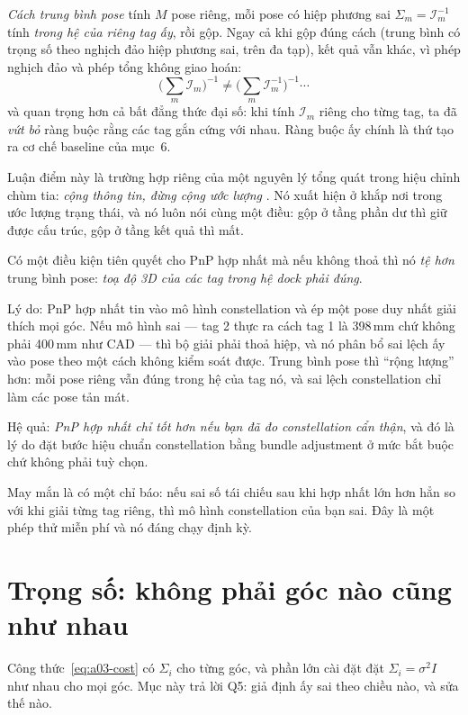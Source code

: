 \documentclass[../../marker.tex]{subfiles}
\begin{document}
\emph{Cách trung bình pose} tính \(M\) pose riêng, mỗi pose có hiệp phương sai \(\Sigma_m = \mathcal{I}_m^{-1}\) tính \emph{trong hệ của riêng tag ấy}, rồi gộp. Ngay cả khi gộp đúng cách (trung bình có trọng số theo nghịch đảo hiệp phương sai, trên đa tạp), kết quả vẫn khác, vì phép nghịch đảo và phép tổng không giao hoán:
\[
\Big(\sum_m \mathcal{I}_m\Big)^{-1} \neq \Big(\sum_m \mathcal{I}_m^{-1}\Big)^{-1}\cdots
\]
và quan trọng hơn cả bất đẳng thức đại số: khi tính \(\mathcal{I}_m\) riêng cho từng tag, ta đã \emph{vứt bỏ} ràng buộc rằng các tag gắn cứng với nhau. Ràng buộc ấy chính là thứ tạo ra cơ chế baseline của  mục~6.

Luận điểm này là trường hợp riêng của một nguyên lý tổng quát trong hiệu chỉnh chùm tia: \emph{cộng thông tin, đừng cộng ước lượng} \cite[§2]{triggs2000bundle}. Nó xuất hiện ở khắp nơi trong ước lượng trạng thái, và nó luôn nói cùng một điều: gộp ở tầng phần dư thì giữ được cấu trúc, gộp ở tầng kết quả thì mất.

\begin{cambay}
Có một điều kiện tiên quyết cho PnP hợp nhất mà nếu không thoả thì nó \emph{tệ hơn} trung bình pose: \emph{toạ độ 3D của các tag trong hệ dock phải đúng}.

Lý do: PnP hợp nhất tin vào mô hình constellation và ép một pose duy nhất giải thích mọi góc. Nếu mô hình sai --- tag 2 thực ra cách tag 1 là 398\,mm chứ không phải 400\,mm như CAD --- thì bộ giải phải thoả hiệp, và nó phân bổ sai lệch ấy vào pose theo một cách không kiểm soát được. Trung bình pose thì ``rộng lượng'' hơn: mỗi pose riêng vẫn đúng trong hệ của tag nó, và sai lệch constellation chỉ làm các pose tản mát.

Hệ quả: \emph{PnP hợp nhất chỉ tốt hơn nếu bạn đã đo constellation cẩn thận}, và đó là lý do  đặt bước hiệu chuẩn constellation bằng bundle adjustment ở mức bắt buộc chứ không phải tuỳ chọn.

May mắn là có một chỉ báo: nếu sai số tái chiếu sau khi hợp nhất lớn hơn hẳn so với khi giải từng tag riêng, thì mô hình constellation của bạn sai. Đây là một phép thử miễn phí và nó đáng chạy định kỳ.
\end{cambay}

\section{Trọng số: không phải góc nào cũng như nhau}

Công thức~\eqref{eq:a03-cost} có \(\Sigma_i\) cho từng góc, và phần lớn cài đặt đặt \(\Sigma_i = \sigma^2 I\) như nhau cho mọi góc. Mục này trả lời Q5: giả định ấy sai theo chiều nào, và sửa thế nào.
\end{document}
